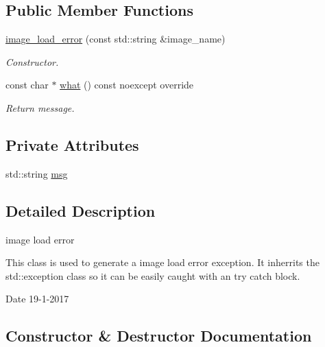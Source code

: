 \subsection*{Public Member Functions}
\begin{DoxyCompactItemize}
\item 
\hyperlink{classimage__load__error_a39665f8755ddd18f61bd837300805cd1}{image\+\_\+load\+\_\+error} (const std\+::string \&image\+\_\+name)
\begin{DoxyCompactList}\small\item\em Constructor. \end{DoxyCompactList}\item 
const char $\ast$ \hyperlink{classimage__load__error_ab73fa8f110ff313005a7bb0ed66fd880}{what} () const noexcept override
\begin{DoxyCompactList}\small\item\em Return message. \end{DoxyCompactList}\end{DoxyCompactItemize}
\subsection*{Private Attributes}
\begin{DoxyCompactItemize}
\item 
std\+::string \hyperlink{classimage__load__error_a250134697d7e52db38453039ad59c7df}{msg}
\end{DoxyCompactItemize}


\subsection{Detailed Description}
image load error 

This class is used to generate a image load error exception. It inherrits the std\+::exception class so it can be easily caught with an try catch block.

\begin{DoxyDate}{Date}
19-\/1-\/2017 
\end{DoxyDate}


\subsection{Constructor \& Destructor Documentation}
\mbox{\label{classimage__load__error_a39665f8755ddd18f61bd837300805cd1}} 
